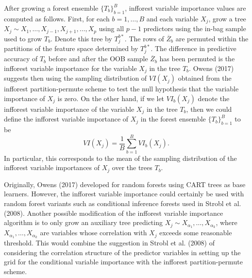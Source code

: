 \documentclass[12pt,twoside]{reedthesis}
\theoremstyle{definition}
\theoremstyle{definition}
\theoremstyle{definition}
\theoremstyle{remark}
\begin{document}
After growing a forest ensemble \(\{T_b\}_{b=1}^B\), infforest variable
importance values are computed as follows. First, for each
\(b=1,\ldots,B\) and each variable \(X_j\), grow a tree
\(X_j\sim X_1,\ldots,X_{j-1},X_{j+1},\ldots,X_p\) using all \(p-1\)
predictors using the in-bag sample used to grow \(T_b\). Denote this
tree by \(T_j^{b*}\). The rows of \(\overline{Z}_b\) are permuted within
the partitions of the feature space determined by \(T_j^{b*}\). The
difference in predictive accuracy of \(T_b\) before and after the OOB
sample \(\overline{Z}_b\) has been permuted is the infforest variable
importance for the variable \(X_j\) in the tree \(T_b\). Owens (2017)
suggests then using the sampling distribution of \(VI(X_j)\) obtained
from the infforest partition-permute scheme to test the null hypothesis
that the variable importance of \(X_j\) is zero. On the other hand, if
we let \(VI_b(X_j)\) denote the infforest variable importance of the
variable \(X_j\) in the tree \(T_b\), then we could define the infforest
variable importance of \(X_j\) in the forest ensemble
\(\{T_b\}_{b=1}^B\) to be \[VI(X_j)=\frac{1}{B}\sum_{b=1}^B VI_b(X_j).\]
In particular, this corresponds to the mean of the sampling distribution
of the infforest variable importances of \(X_j\) over the trees \(T_b\).
\par

Originally, Owens (2017) developed for random forests using CART trees
as base learners. However, the infforest variable importance could
certainly be used with random forest variants such as conditional
inference forests used in Strobl et al. (2008). Another possible
modification of the infforest variable importance algorithm is to only
grow an auxiliary tree predicting
\(X_j\sim X_{\alpha_1},\ldots,X_{\alpha_k}\), where
\(X_{\alpha_1},\ldots,X_{\alpha_k}\) are variables whose correlation
with \(X_j\) exceeds some reasonable threshold. This would combine the
suggestion in Strobl et al. (2008) of considering the correlation
structure of the predictor variables in setting up the grid for the
conditional variable importance with the infforest partition-permute
scheme. \par
\end{document}
